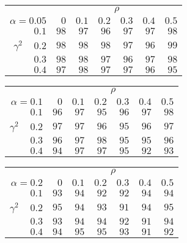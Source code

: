 \begin{tabular}{r|rrrrrr}
\hline\hline
 &\multicolumn{6}{c}{$\rho$} \\ 
 $\alpha = 0.05$ & $0$ & $0.1$ & $0.2$ & $0.3$ & $0.4$ & $0.5$ \\ 
 \hline$0.1$ & $98$ & $97$ & $96$ & $97$ & $97$ & $98$\\ 
$\gamma^2\;\;\;$ $0.2$ & $98$ & $98$ & $98$ & $97$ & $96$ & $99$\\ 
$0.3$ & $98$ & $98$ & $97$ & $96$ & $97$ & $98$\\ 
$0.4$ & $97$ & $98$ & $97$ & $97$ & $96$ & $95$\\ 
 \hline 
 \end{tabular}
 
 \vspace{2em} 
 
\begin{tabular}{r|rrrrrr}
\hline\hline
 &\multicolumn{6}{c}{$\rho$} \\ 
 $\alpha = 0.1$ & $0$ & $0.1$ & $0.2$ & $0.3$ & $0.4$ & $0.5$ \\ 
 \hline$0.1$ & $96$ & $97$ & $95$ & $96$ & $97$ & $98$\\ 
$\gamma^2\;\;\;$ $0.2$ & $97$ & $97$ & $96$ & $95$ & $96$ & $97$\\ 
$0.3$ & $96$ & $97$ & $98$ & $95$ & $95$ & $96$\\ 
$0.4$ & $94$ & $97$ & $97$ & $95$ & $92$ & $93$\\ 
 \hline 
 \end{tabular}
 
 \vspace{2em} 
 
\begin{tabular}{r|rrrrrr}
\hline\hline
 &\multicolumn{6}{c}{$\rho$} \\ 
 $\alpha = 0.2$ & $0$ & $0.1$ & $0.2$ & $0.3$ & $0.4$ & $0.5$ \\ 
 \hline$0.1$ & $93$ & $94$ & $92$ & $92$ & $94$ & $94$\\ 
$\gamma^2\;\;\;$ $0.2$ & $95$ & $94$ & $93$ & $91$ & $94$ & $95$\\ 
$0.3$ & $93$ & $94$ & $94$ & $92$ & $91$ & $94$\\ 
$0.4$ & $94$ & $95$ & $95$ & $93$ & $91$ & $92$\\ 
 \hline 
 \end{tabular}